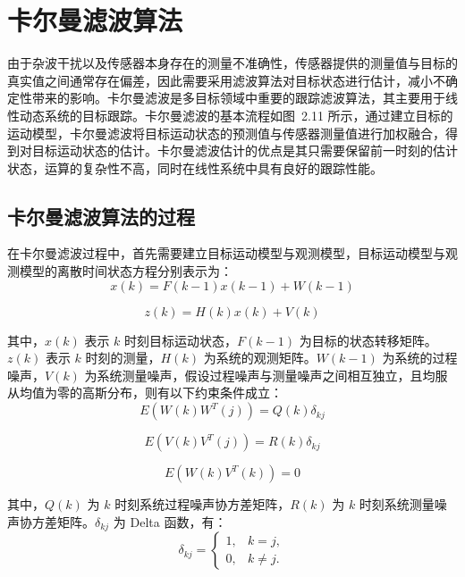 \documentclass{xdupgthesis}
\begin{document}
\section{卡尔曼滤波算法}

由于杂波干扰以及传感器本身存在的测量不准确性，传感器提供的测量值与目标的真实值之间通常存在偏差，因此需要采用滤波算法对目标状态进行估计，减小不确定性带来的影响。卡尔曼滤波是多目标领域中重要的跟踪滤波算法，其主要用于线性动态系统的目标跟踪。卡尔曼滤波的基本流程如图~2.11 所示，通过建立目标的运动模型，卡尔曼滤波将目标运动状态的预测值与传感器测量值进行加权融合，得到对目标运动状态的估计。卡尔曼滤波估计的优点是其只需要保留前一时刻的估计状态，运算的复杂性不高，同时在线性系统中具有良好的跟踪性能。

\subsection{卡尔曼滤波算法的过程}

在卡尔曼滤波过程中，首先需要建立目标运动模型与观测模型，目标运动模型与观测模型的离散时间状态方程分别表示为：
\begin{equation}
	x(k)=F(k-1)x(k-1)+W(k-1)
	\tag{2-2}
\end{equation}

\begin{equation}
	z(k)=H(k)x(k)+V(k)
	\tag{2-3}
\end{equation}

其中，$x(k)$ 表示 $k$ 时刻目标运动状态，$F(k-1)$ 为目标的状态转移矩阵。$z(k)$ 表示 $k$ 时刻的测量，$H(k)$ 为系统的观测矩阵。$W(k-1)$ 为系统的过程噪声，$V(k)$ 为系统测量噪声，假设过程噪声与测量噪声之间相互独立，且均服从均值为零的高斯分布，则有以下约束条件成立：
\begin{equation}
	E\!\left(W(k)W^{T}(j)\right)=Q(k)\delta_{kj}
	\tag{2-4}
\end{equation}

\begin{equation}
	E\!\left(V(k)V^{T}(j)\right)=R(k)\delta_{kj}
	\tag{2-5}
\end{equation}

\begin{equation}
	E\!\left(W(k)V^{T}(k)\right)=0
	\tag{2-6}
\end{equation}

其中，$Q(k)$ 为 $k$ 时刻系统过程噪声协方差矩阵，$R(k)$ 为 $k$ 时刻系统测量噪声协方差矩阵。$\delta_{kj}$ 为 Delta 函数，有：
\begin{equation}
	\delta_{kj}=
	\begin{cases}
		1, & k=j,\\
		0, & k\neq j.
	\end{cases}
	\tag{2-7}
\end{equation}
\end{document}
